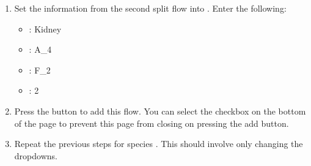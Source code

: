 \documentclass[letterpaper,10pt,english]{sphinxmanual}
\begin{document}
\begin{enumerate}
\begin{itemize}
\item {} 
\sphinxAtStartPar
{}: F\_1

\item {} 
\sphinxAtStartPar
{}: 3

\end{itemize}

\item {} 
\sphinxAtStartPar
Set the information from the second split flow into . Enter
the following:
\begin{itemize}
\item {} 
\sphinxAtStartPar
{}: Kidney

\item {} 
\sphinxAtStartPar
{}: A\_4

\item {} 
\sphinxAtStartPar
{}: F\_2

\item {} 
\sphinxAtStartPar
{}: 2

\end{itemize}

\item {} 
\sphinxAtStartPar
Press the  button to add this flow. You can select the
 checkbox on the bottom of the page to prevent this page
from closing on pressing the add button.

\begin{figure}[htbp]
\centering

\noindent{}
\end{figure}

\item {} 
\sphinxAtStartPar
Repeat the previous steps for species . This should involve only
changing the  dropdowns.
\begin{quote}

\begin{figure}[htbp]
\centering

\noindent{}
\end{figure}
\end{quote}

\end{enumerate}
\end{document}
